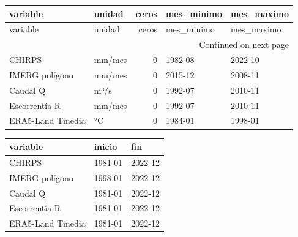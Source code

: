 \documentclass[10pt,a4paper]{article}
\begin{document}
{\scriptsize
\begin{longtable}{llrll}
\toprule
variable & unidad & ceros & mes\_minimo & mes\_maximo \\
\midrule
\endfirsthead
\toprule
variable & unidad & ceros & mes\_minimo & mes\_maximo \\
\midrule
\endhead
\midrule
\multicolumn{5}{r}{Continued on next page} \\
\midrule
\endfoot
\bottomrule
\endlastfoot
CHIRPS & mm/mes & 0 & 1982-08 & 2022-10 \\
IMERG polígono & mm/mes & 0 & 2015-12 & 2008-11 \\
Caudal Q & m³/s & 0 & 1992-07 & 2010-11 \\
Escorrentía R & mm/mes & 0 & 1992-07 & 2010-11 \\
ERA5-Land Tmedia & °C & 0 & 1984-01 & 1998-01 \\
\end{longtable}
}
{\scriptsize
\begin{center}
\begin{tabular}{lll}
\toprule
variable & inicio & fin \\
\midrule
CHIRPS & 1981-01 & 2022-12 \\
IMERG polígono & 1998-01 & 2022-12 \\
Caudal Q & 1981-01 & 2022-12 \\
Escorrentía R & 1981-01 & 2022-12 \\
ERA5-Land Tmedia & 1981-01 & 2022-12 \\
\bottomrule
\end{tabular}
\end{center}
}
\end{document}
